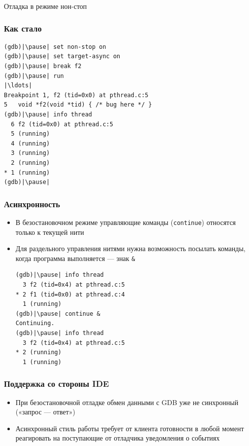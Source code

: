 \documentclass[onlymath]{beamer}
\newcommand\code\texttt
\begin{document}
\begin{subsection}{Отладка в режиме нон-стоп}
\begin{frame}[fragile]
  \frametitle{Как стало}
\begin{lstlisting}[style=gdbsession]
(gdb)|\pause| set non-stop on
(gdb)|\pause| set target-async on
(gdb)|\pause| break f2
(gdb)|\pause| run
|\ldots|
Breakpoint 1, f2 (tid=0x0) at pthread.c:5
5	void *f2(void *tid) { /* bug here */ }
(gdb)|\pause| info thread
  6 f2 (tid=0x0) at pthread.c:5
  5 (running)
  4 (running)
  3 (running)
  2 (running)
* 1 (running)
(gdb)|\pause|
\end{lstlisting}
\end{frame}

\begin{frame}[fragile]
  \frametitle{Асинхронность}
  \begin{itemize}
  \item В безостановочном режиме управляющие команды (\code{continue})
    относятся только к текущей нити
  \item Для раздельного управления нитями нужна возможность посылать
    команды, когда программа выполняется — знак \code{\&}
\begin{lstlisting}[style=gdbsession]
(gdb)|\pause| info thread
  3 f2 (tid=0x4) at pthread.c:5
* 2 f1 (tid=0x0) at pthread.c:4
  1 (running)
(gdb)|\pause| continue &
Continuing.
(gdb)|\pause| info thread
  3 f2 (tid=0x4) at pthread.c:5
* 2 (running)
  1 (running)
\end{lstlisting}
  \end{itemize}
\end{frame}

\begin{frame}
  \frametitle{Поддержка со стороны IDE}
  \begin{itemize}
  \item При безостановочной отладке обмен данными с GDB уже не
    синхронный («запрос — ответ»)
  \item Асинхронный стиль работы требует от клиента готовности в любой
    момент реагировать на поступающие от отладчика уведомления о
    событиях
  \end{itemize}
\end{frame}
\end{subsection}
\end{document}
